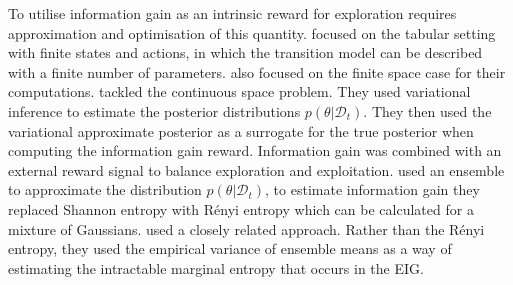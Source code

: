 \documentclass[a4paper, 10pt]{report}
\theoremstyle{plain}
\begin{document}
	To utilise information gain as an intrinsic reward for exploration requires approximation and optimisation of this quantity.
	\citet{storck1995reinforcement} focused on the tabular setting with finite states and actions, in which the transition model can be described with a finite number of parameters.
	\citet{sun2011planning} also focused on the finite space case for their computations.
	\citet{houthooft2016vime} tackled the continuous space problem. They used variational inference \citep{rezende2014stochastic,kingma2014auto} to estimate the posterior distributions $p(\theta|\mathcal{D}_t)$.
	They then used the variational approximate posterior as a surrogate for the true posterior when computing the information gain reward.
	Information gain was combined with an external reward signal to balance exploration and exploitation.
	\citet{shyam2019model} used an ensemble to approximate the distribution $p(\theta|\mathcal{D}_t)$, to estimate information gain they replaced Shannon entropy with R\'enyi entropy which can be calculated for a mixture of Gaussians.
	\citet{sekar2020planning} used a closely related approach. Rather than the R\'enyi entropy, they used the empirical variance of ensemble means as a way of estimating the intractable marginal entropy that occurs in the EIG.
	
	
	
	
	
	
	
	
	
\end{document}
